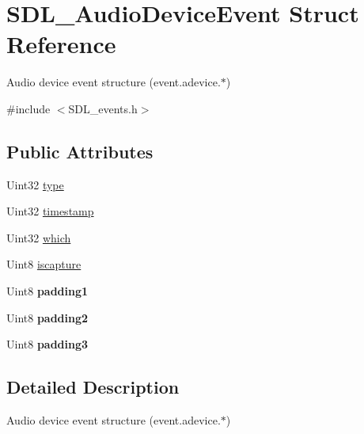\hypertarget{struct_s_d_l___audio_device_event}{}\section{S\+D\+L\+\_\+\+Audio\+Device\+Event Struct Reference}
\label{struct_s_d_l___audio_device_event}


Audio device event structure (event.\+adevice.$\ast$)  




{\ttfamily \#include $<$S\+D\+L\+\_\+events.\+h$>$}

\subsection*{Public Attributes}
\begin{DoxyCompactItemize}
\item 
Uint32 \mbox{\hyperlink{struct_s_d_l___audio_device_event_ae68c3bd49b49608711a17395c7cbfe58}{type}}
\item 
Uint32 \mbox{\hyperlink{struct_s_d_l___audio_device_event_aa471680486a6103eafc9af569016df57}{timestamp}}
\item 
Uint32 \mbox{\hyperlink{struct_s_d_l___audio_device_event_ac91d70fd4e1dd596185fed061388896c}{which}}
\item 
Uint8 \mbox{\hyperlink{struct_s_d_l___audio_device_event_a1482dcd50b47046ef8e9bfa7cc7457d9}{iscapture}}
\item 
\mbox{\label{struct_s_d_l___audio_device_event_ad6efdec7189e735f4a05fc123c0cb723}} 
Uint8 {\bfseries padding1}
\item 
\mbox{\label{struct_s_d_l___audio_device_event_adf9bebd56d707860045d31359535a2a4}} 
Uint8 {\bfseries padding2}
\item 
\mbox{\label{struct_s_d_l___audio_device_event_af3163ba92c77f08a4f0d8f043f24c96c}} 
Uint8 {\bfseries padding3}
\end{DoxyCompactItemize}


\subsection{Detailed Description}
Audio device event structure (event.\+adevice.$\ast$) 

